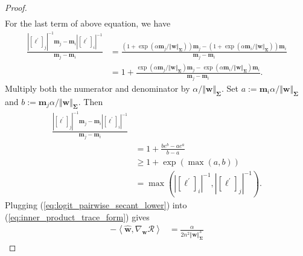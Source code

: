 \documentclass[pdflatex,sn-basic]{sn-jnl}%
\theoremstyle{thmstyleone}%
\begin{document}
\begin{appendices}
\begin{proof}
\begin{equation}
\begin{aligned}
  \end{aligned}
  \end{equation}
  For the last term of above equation, we have 
  \begin{equation*}
  \begin{aligned}
    \frac{
      |[\boldsymbol{\ell^{\prime}}]_j|^{-1} \mathbf{m}_j
      -
      \mathbf{m}_i |[\boldsymbol{\ell^{\prime}}]_i|^{-1}
    }{\mathbf{m}_j -  \mathbf{m}_i }
    & = 
    \frac{
      \left(
        1 + \exp( \alpha \mathbf{m}_j / \Vert \mathbf{w} \Vert_{\mathbf{\Sigma}} )
      \right)
       \mathbf{m}_j
      -
      \left(
        1 + \exp( \alpha \mathbf{m}_i / \Vert \mathbf{w} \Vert_{\mathbf{\Sigma}} )
      \right)
      \mathbf{m}_i 
    }{\mathbf{m}_j -  \mathbf{m}_i }
    \\ & = 
    1 + 
    \frac{
      \exp( \alpha \mathbf{m}_j / \Vert \mathbf{w} \Vert_{\mathbf{\Sigma}} )
      \mathbf{m}_j
      -
      \exp( \alpha \mathbf{m}_i / \Vert \mathbf{w} \Vert_{\mathbf{\Sigma}} )
      \mathbf{m}_i 
    }{\mathbf{m}_j -  \mathbf{m}_i }.
  \end{aligned}
  \end{equation*}
  Multiply both the numerator and denominator by $\alpha / \Vert \mathbf{w} \Vert_{\mathbf{\Sigma}}$.
  Set
  $a := \mathbf{m}_i \alpha / \Vert \mathbf{w} \Vert_{\mathbf{\Sigma}}$
  and
  $b := \mathbf{m}_j \alpha / \Vert \mathbf{w} \Vert_{\mathbf{\Sigma}}$.
  Then
  \begin{equation}\label{eq:logit_pairwise_secant_lower}
  \begin{aligned}
    \frac{
      |[\boldsymbol{\ell^{\prime}}]_j|^{-1} \mathbf{m}_j
      -
      \mathbf{m}_i |[\boldsymbol{\ell^{\prime}}]_i|^{-1}
    }{\mathbf{m}_j -  \mathbf{m}_i }
    \\ & =
    1
    +
    \frac{b e^{b}-a e^{a}}{b - a} 
    \\ & \ge 
    1 + \exp \left(\max(a, b)\right) 
    \\ & =
    \max\left(
      | [\boldsymbol{\ell^{\prime}}]_{i} |^{-1}, 
      | [\boldsymbol{\ell^{\prime}}]_{j} |^{-1}
    \right).
  \end{aligned}
  \end{equation}
  Plugging (\ref{eq:logit_pairwise_secant_lower}) into (\ref{eq:inner_product_trace_form}) gives
  \begin{equation*}
  \begin{aligned}
    - \left\langle \hat{\mathbf{w}}, \nabla_{\mathbf{w}} \mathcal{R} \right\rangle 
    &= 
    \frac{\alpha }{2 n^2 \Vert \mathbf{w} \Vert_{\mathbf{\Sigma}}^3}

\end{aligned}
\end{equation*}
\end{proof}
\end{appendices}
\end{document}
